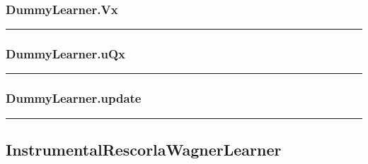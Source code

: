 \hypertarget{dummylearner.vx}{%
\subsubsection{DummyLearner.Vx}\label{dummylearner.vx}}

\begin{Shaded}
\begin{Highlighting}[]
\end{Highlighting}
\end{Shaded}

\begin{center}\rule{0.5\linewidth}{\linethickness}\end{center}

\hypertarget{dummylearner.uqx}{%
\subsubsection{DummyLearner.uQx}\label{dummylearner.uqx}}

\begin{Shaded}
\begin{Highlighting}[]
\end{Highlighting}
\end{Shaded}

\begin{center}\rule{0.5\linewidth}{\linethickness}\end{center}

\hypertarget{dummylearner.update}{%
\subsubsection{DummyLearner.update}\label{dummylearner.update}}

\begin{Shaded}
\begin{Highlighting}[]
\end{Highlighting}
\end{Shaded}

\begin{center}\rule{0.5\linewidth}{\linethickness}\end{center}

\hypertarget{instrumentalrescorlawagnerlearner}{%
\subsection{InstrumentalRescorlaWagnerLearner}\label{instrumentalrescorlawagnerlearner}}

